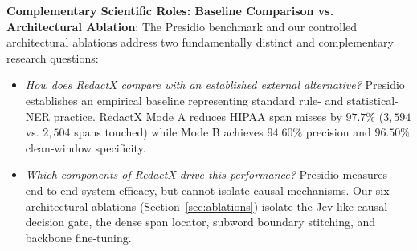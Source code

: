 \documentclass[11pt,a4paper]{article}
\begin{document}
\noindent\textbf{Complementary Scientific Roles: Baseline Comparison vs. Architectural Ablation}:
The Presidio benchmark and our controlled architectural ablations address two fundamentally distinct and complementary research questions:
\begin{itemize}
    \item \textit{How does RedactX compare with an established external alternative?} Presidio establishes an empirical baseline representing standard rule- and statistical-NER practice. RedactX Mode A reduces HIPAA span misses by $97.7\%$ ($3,594$ vs. $2,504$ spans touched) while Mode B achieves $94.60\%$ precision and $96.50\%$ clean-window specificity.
    \item \textit{Which components of RedactX drive this performance?} Presidio measures end-to-end system efficacy, but cannot isolate causal mechanisms. Our six architectural ablations (Section~\ref{sec:ablations}) isolate the Jev-like causal decision gate, the dense span locator, subword boundary stitching, and backbone fine-tuning.
\end{itemize}
\end{document}
